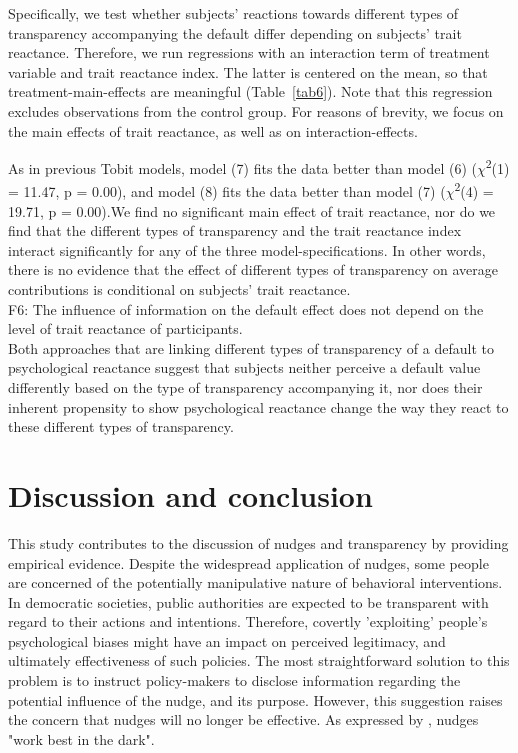 \documentclass[review, authoryear,12pt]{elsarticle}
\begin{document}
Specifically, we test whether subjects' reactions towards different types of transparency accompanying the default differ depending on subjects' trait reactance. Therefore, we run regressions with an interaction term of treatment variable and trait reactance index. The latter is centered on the mean, so that treatment-main-effects are meaningful (Table~\ref{tab6}). Note that this regression excludes observations from the control group. For reasons of brevity, we focus on the main effects of trait reactance, as well as on interaction-effects.

As in previous Tobit models, model (7) fits the data better than model (6) ($\chi$\textsuperscript{2}(1) = 11.47, p = 0.00), and model (8) fits the data better than model (7) ($\chi$\textsuperscript{2}(4) = 19.71, p = 0.00).We find no significant main effect of trait reactance, nor do we find that the different types of transparency and the trait reactance index interact significantly for any of the three model-specifications. In other words, there is no evidence that the effect of different types of transparency on average contributions is conditional on subjects' trait reactance. \\

F6: The influence of information on the default effect does not depend on the level of trait reactance of participants. \\

Both approaches that are linking different types of transparency of a default to psychological reactance suggest that subjects neither perceive a default value differently based on the type of transparency accompanying it, nor does their inherent propensity to show psychological reactance change the way they react to these different types of transparency.

\section{Discussion and conclusion}
This study contributes to the discussion of nudges and transparency by providing empirical evidence. Despite the widespread application of nudges, some people are concerned of the potentially manipulative nature of behavioral interventions. In democratic societies, public authorities are expected to be transparent with regard to their actions and intentions. Therefore, covertly 'exploiting' people's psychological biases might have an impact on perceived legitimacy, and ultimately effectiveness of such policies. The most straightforward solution to this problem is to instruct policy-makers to disclose information regarding the potential influence of the nudge, and its purpose. However, this suggestion raises the concern that nudges will no longer be effective. As expressed by \cite{Bovens.2009}, nudges "work best in the dark".
\end{document}
